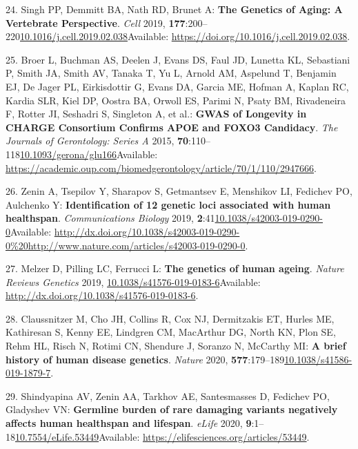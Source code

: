 \documentclass[
]{book}
\begin{document}
\leavevmode\hypertarget{ref-Singh2019}{}%
24. Singh PP, Demmitt BA, Nath RD, Brunet A: \textbf{The Genetics of Aging: A Vertebrate Perspective}. \emph{Cell} 2019, \textbf{177}:200--220\href{https://doi.org/10.1016/j.cell.2019.02.038}{10.1016/j.cell.2019.02.038}Available: \url{https://doi.org/10.1016/j.cell.2019.02.038}.

\leavevmode\hypertarget{ref-Broer2015}{}%
25. Broer L, Buchman AS, Deelen J, Evans DS, Faul JD, Lunetta KL, Sebastiani P, Smith JA, Smith AV, Tanaka T, Yu L, Arnold AM, Aspelund T, Benjamin EJ, De Jager PL, Eirkisdottir G, Evans DA, Garcia ME, Hofman A, Kaplan RC, Kardia SLR, Kiel DP, Oostra BA, Orwoll ES, Parimi N, Psaty BM, Rivadeneira F, Rotter JI, Seshadri S, Singleton A, et al.: \textbf{GWAS of Longevity in CHARGE Consortium Confirms APOE and FOXO3 Candidacy}. \emph{The Journals of Gerontology: Series A} 2015, \textbf{70}:110--118\href{https://doi.org/10.1093/gerona/glu166}{10.1093/gerona/glu166}Available: \url{https://academic.oup.com/biomedgerontology/article/70/1/110/2947666}.

\leavevmode\hypertarget{ref-Zenin2019}{}%
26. Zenin A, Tsepilov Y, Sharapov S, Getmantsev E, Menshikov LI, Fedichev PO, Aulchenko Y: \textbf{Identification of 12 genetic loci associated with human healthspan}. \emph{Communications Biology} 2019, \textbf{2}:41\href{https://doi.org/10.1038/s42003-019-0290-0}{10.1038/s42003-019-0290-0}Available: \url{http://dx.doi.org/10.1038/s42003-019-0290-0\%20http://www.nature.com/articles/s42003-019-0290-0}.

\leavevmode\hypertarget{ref-Melzer2019}{}%
27. Melzer D, Pilling LC, Ferrucci L: \textbf{The genetics of human ageing}. \emph{Nature Reviews Genetics} 2019, \href{https://doi.org/10.1038/s41576-019-0183-6}{10.1038/s41576-019-0183-6}Available: \url{http://dx.doi.org/10.1038/s41576-019-0183-6}.

\leavevmode\hypertarget{ref-Claussnitzer2020}{}%
28. Claussnitzer M, Cho JH, Collins R, Cox NJ, Dermitzakis ET, Hurles ME, Kathiresan S, Kenny EE, Lindgren CM, MacArthur DG, North KN, Plon SE, Rehm HL, Risch N, Rotimi CN, Shendure J, Soranzo N, McCarthy MI: \textbf{A brief history of human disease genetics}. \emph{Nature} 2020, \textbf{577}:179--189\href{https://doi.org/10.1038/s41586-019-1879-7}{10.1038/s41586-019-1879-7}.

\leavevmode\hypertarget{ref-Shindyapina2020}{}%
29. Shindyapina AV, Zenin AA, Tarkhov AE, Santesmasses D, Fedichev PO, Gladyshev VN: \textbf{Germline burden of rare damaging variants negatively affects human healthspan and lifespan}. \emph{eLife} 2020, \textbf{9}:1--18\href{https://doi.org/10.7554/eLife.53449}{10.7554/eLife.53449}Available: \url{https://elifesciences.org/articles/53449}.
\end{document}
